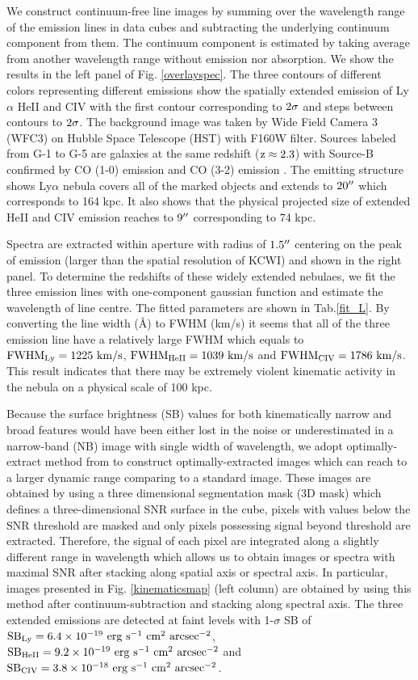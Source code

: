 \documentclass[../Results.tex]{subfiles}
\begin{document}
We construct continuum-free line images by summing over the wavelength range of the emission lines in data cubes and subtracting the underlying continuum component from them. The continuum component is estimated by taking average from another wavelength range without emission nor absorption. We show the results in the left panel of Fig. \ref{overlayspec}. The three contours of different colors representing different emissions show the spatially extended emission of Ly$\alpha$ HeII and CIV with the first contour corresponding to $\rm 2\sigma$ and steps between contours to $\rm 2\sigma$. The background image was taken by Wide Field Camera 3 (WFC3) on Hubble Space Telescope (HST) with F160W filter. Sources labeled from G-1 to G-5 are galaxies at the same redshift ($\rm z \approx 2.3$) with Source-B confirmed by CO (1-0) emission and CO (3-2) emission \citep{emonts2019cold,qiongli2020}. The emitting structure shows Ly$\alpha$ nebula covers all of the marked objects and extends to $\rm 20\mbox{$^{\prime\prime}$}$ which corresponds to 164 kpc. It also shows that the physical projected size of extended HeII and CIV emission reaches to $9 \mbox{$^{\prime\prime}$}$ corresponding to 74 kpc.

Spectra are extracted within aperture with radius of $1.5\mbox{$^{\prime\prime}$}$ centering on the peak of emission (larger than the spatial resolution of KCWI) and shown in the right panel. To determine the redshifts of these widely extended nebulaes, we fit the three emission lines with one-component gaussian function and estimate the wavelength of line centre. The fitted parameters are shown in Tab.\ref{fit_L}. By converting the line width (\AA) to FWHM (km/s) it seems that all of the three emission line have a relatively large FWHM which equals to $\rm FWHM_{Ly}=1225 \ km/s$, $\rm FWHM_{HeII}=1039 \ km/s$ and $\rm FWHM_{CIV}=1786 \ km/s$. This result indicates that there may be extremely violent kinematic activity in the nebula on a physical scale of 100 kpc.

Because the surface brightness (SB) values for both kinematically narrow and broad features would have been either lost in the noise or underestimated in a narrow-band (NB) image with single width of wavelength, we adopt optimally-extract method from \citet{borisova2016ubiquitous} to construct optimally-extracted images which can reach to a larger dynamic range comparing to a standard image. These images are obtained by using a three dimensional segmentation mask (3D mask) which defines a three-dimensional SNR surface in the cube, pixels with values below the SNR threshold are masked and only pixels possessing signal beyond threshold are extracted. Therefore, the signal of each pixel are integrated along a slightly different range in wavelength which allows us to obtain images or spectra with maximal SNR after stacking along spatial axis or spectral axis. In particular, images presented in Fig. \ref{kinematicsmap} (left column) are obtained by using this method after continuum-subtraction and stacking along spectral axis. The three extended emissions are detected at faint levels with 1-$\sigma$ SB of $\rm SB_{Ly}=6.4  \times 10^{-19} \ erg \ s^{-1} \ cm^{2} \ arcsec^{-2}$, $\rm SB_{HeII}= 9.2 \times 10^{-19} \ erg \ s^{-1} \ cm^{2} \ arcsec^{-2}$ and $\rm SB_{CIV}=3.8 \times 10^{-18} \ erg \ s^{-1} \ cm^{2} \ arcsec^{-2}$. 
\end{document}
